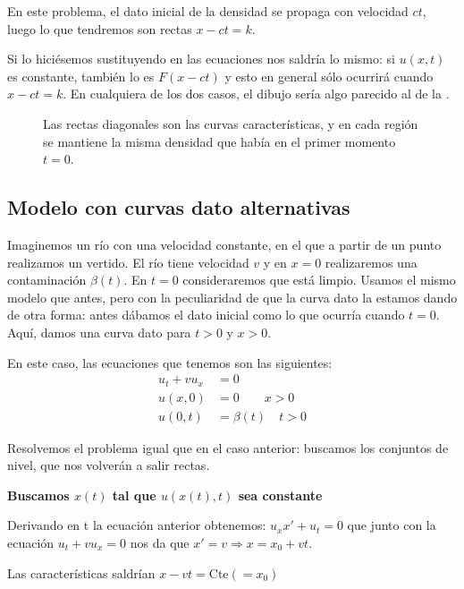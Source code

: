 			En este problema, el dato inicial de la densidad se propaga con velocidad $ct$, luego lo que tendremos son rectas $x - ct = k$.

			Si lo hiciésemos sustituyendo en las ecuaciones nos saldría lo mismo: si $u(x,t)$ es constante, también lo es $F(x-ct)$ y esto en general sólo ocurrirá cuando $x - ct = k$. En cualquiera de los dos casos, el dibujo sería algo parecido al de la .

			\begin{figure}
			\centering
			\caption{Las rectas diagonales son las curvas características, y en cada región se mantiene la misma densidad que había en el primer momento $t = 0$.}
			\label{fig:ConjNivelCochesSimple}
			\end{figure}



	\subsection{Modelo con curvas dato alternativas}
		\label{sec:CurvaDatoRara}

		Imaginemos un río con una velocidad constante, en el que a partir de un punto realizamos un vertido. El río tiene velocidad $v$ y en ${x=0}$ realizaremos una contaminación $\beta(t)$. En ${t=0}$ consideraremos que está limpio. Usamos el mismo modelo que antes, pero con la peculiaridad de que la curva dato la estamos dando de otra forma: antes dábamos el dato inicial como lo que ocurría cuando ${t = 0}$. Aquí, damos una curva dato para $t > 0$ y $x > 0$.

		En este caso, las ecuaciones que tenemos son las siguientes:
		\begin{align*}
		u_t + vu_x &= 0 \\
		u(x,0) &= 0 \qquad x>0 \\
		u(0,t) &= \beta(t)\quad t>0
		\end{align*}

		Resolvemos el problema igual que en el caso anterior: buscamos los conjuntos de nivel, que nos volverán a salir rectas.

		\textbf{Buscamos $x(t)$ tal que $u(x(t),t)$ sea constante}

		Derivando en t la ecuación anterior obtenemos: $u_x x' + u_t = 0$ que junto con la ecuación $u_t + v u_x = 0$ nos da que $x' = v \Rightarrow x = x_0 + vt $.

		Las características saldrían \(x-vt = \text{Cte}(=x_0) \label{eq:rio_vcte}\)

